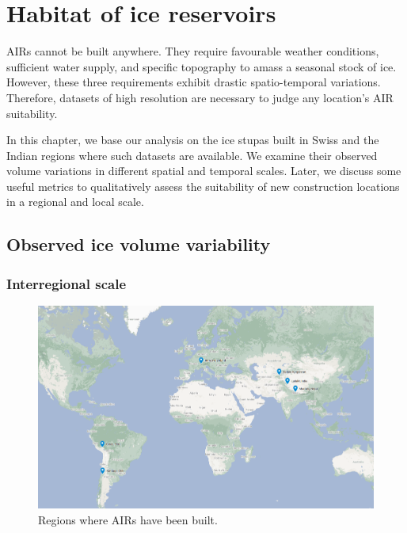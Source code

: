 \chapter{Habitat of ice reservoirs}


AIRs cannot be built anywhere. They require favourable weather conditions, sufficient water supply, and specific
topography to amass a seasonal stock of ice. However, these three requirements exhibit drastic
spatio-temporal variations. Therefore, datasets of high resolution are necessary to judge any location's AIR
suitability. 

In this chapter, we base our analysis on the ice stupas built in Swiss and the Indian regions where such
datasets are available. We examine their observed volume variations in different spatial and temporal scales.
Later, we discuss some useful metrics to qualitatively assess the suitability of new construction locations in a
regional and local scale.

\section{Observed ice volume variability}

\subsection{Interregional scale}

\begin{figure}[htb]
\centering
\includegraphics[width=\textwidth]{figs/AIR_regions.png}
\caption{Regions where AIRs have been built.}
\label{fig:AIR_regions}
\end{figure}

